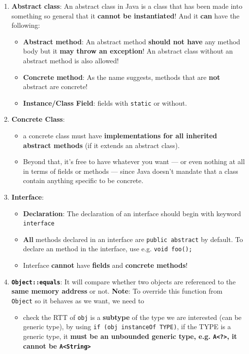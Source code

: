 \documentclass[10pt, landscape]{article}
\begin{document}
\begin{multicols}{4}
\begin{enumerate}
    \item \textbf{Abstract class}: An abstract class in Java is a class that has been made into something so general that it \textbf{cannot be instantiated}! And it \textbf{can} have the following:
    \begin{itemize}
        \item \textbf{Abstract method}: An abstract method \textbf{should not have} any method body but it \textbf{may throw an exception}! An abstract class without an abstract method is also allowed!
        \item \textbf{Concrete method}: As the name suggests, methods that are \textbf{not} abstract are concrete!
        \item \textbf{Instance/Class Field}: fields with \texttt{static} or without.
    \end{itemize}
    \item \textbf{Concrete Class}:
    \begin{itemize}
        \item a concrete class must have \textbf{implementations for all inherited abstract methods} (if it extends an abstract class).
        \item Beyond that, it’s free to have whatever you want — or even nothing at all in terms of fields or methods — since Java doesn’t mandate that a class contain anything specific to be concrete.
    \end{itemize}
    \item \textbf{Interface}:
    \begin{itemize}
        \item \textbf{Declaration}: The declaration of an interface should begin with keyword \texttt{interface}
        \item \textbf{All} methods declared in an interface are \texttt{public abstract} by default. To declare an method in the interface, use e.g. \texttt{void foo();}
        \item Interface \textbf{cannot} have \textbf{fields} and \textbf{concrete methods}!
    \end{itemize}
    \item \textbf{\texttt{Object::equals}}: It will compare whether two objects are referenced to the \textbf{same memory address} or not.
    \textbf{Note}: To override this function from \texttt{Object} so it behaves as we want, we need to 
    \begin{itemize}
        \item check the RTT of \texttt{obj} is a \textbf{subtype} of the type we are interested (can be generic type), by using \texttt{if (obj instanceOf TYPE)}, if the TYPE is a generic type, it \textbf{must be an unbounded generic type, e.g. \texttt{A<?>}, it cannot be \texttt{A<String>}}

\end{itemize}
\end{enumerate}
\end{multicols}
\end{document}
